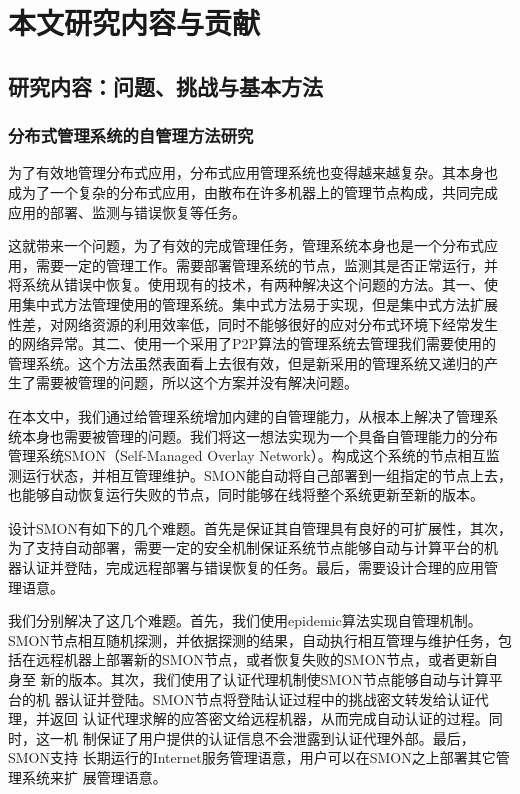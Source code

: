 % 
% 
% 
% 
% 
% 
% 
% 
% 
% 


\section{本文研究内容与贡献}
\label{sec:intro_contrib}

\subsection{研究内容：问题、挑战与基本方法}

\subsubsection*{分布式管理系统的自管理方法研究}

为了有效地管理分布式应用，分布式应用管理系统也变得越来越复杂。其本身也
成为了一个复杂的分布式应用，由散布在许多机器上的管理节点构成，共同完成
应用的部署、监测与错误恢复等任务。

这就带来一个问题，为了有效的完成管理任务，管理系统本身也是一个分布式应
用，需要一定的管理工作。需要部署管理系统的节点，监测其是否正常运行，并
将系统从错误中恢复。使用现有的技术，有两种解决这个问题的方法。其一、使
用集中式方法管理使用的管理系统。集中式方法易于实现，但是集中式方法扩展
性差，对网络资源的利用效率低，同时不能够很好的应对分布式环境下经常发生
的网络异常。其二、使用一个采用了P2P算法的管理系统去管理我们需要使用的
管理系统。这个方法虽然表面看上去很有效，但是新采用的管理系统又递归的产
生了需要被管理的问题，所以这个方案并没有解决问题。

在本文中，我们通过给管理系统增加内建的自管理能力，从根本上解决了管理系
统本身也需要被管理的问题。我们将这一想法实现为一个具备自管理能力的分布
管理系统SMON（Self-Managed Overlay Network）。构成这个系统的节点相互监
测运行状态，并相互管理维护。SMON能自动将自己部署到一组指定的节点上去，
也能够自动恢复运行失败的节点，同时能够在线将整个系统更新至新的版本。

设计SMON有如下的几个难题。首先是保证其自管理具有良好的可扩展性，其次，
为了支持自动部署，需要一定的安全机制保证系统节点能够自动与计算平台的机
器认证并登陆，完成远程部署与错误恢复的任务。最后，需要设计合理的应用管
理语意。

我们分别解决了这几个难题。首先，我们使用epidemic算法实现自管理机制。
SMON节点相互随机探测，并依据探测的结果，自动执行相互管理与维护任务，包
括在远程机器上部署新的SMON节点，或者恢复失败的SMON节点，或者更新自身至
新的版本。其次，我们使用了认证代理机制使SMON节点能够自动与计算平台的机
器认证并登陆。SMON节点将登陆认证过程中的挑战密文转发给认证代理，并返回
认证代理求解的应答密文给远程机器，从而完成自动认证的过程。同时，这一机
制保证了用户提供的认证信息不会泄露到认证代理外部。最后，SMON支持
长期运行的Internet服务管理语意，用户可以在SMON之上部署其它管理系统来扩
展管理语意。

